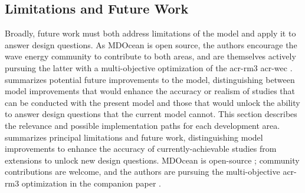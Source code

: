 \subsection{Limitations and Future Work}\label{sec:unmodeled-effects}
\ifdefined\DISSERTATION
    Broadly, future work must both address limitations of the model and apply it to answer design questions.
    As MDOcean is open source, the authors encourage the wave energy community to contribute to both areas, and are themselves actively pursuing the latter with a multi-objective optimization of the \gls{acr-rm3} \gls{acr-wec} \citep{mccabe_leveraging_2026}.
     summarizes potential future improvements to the model, distinguishing between model improvements that would enhance the accuracy or realism of studies that can be conducted with the present model and those that would unlock the ability to answer design questions that the current model cannot.
    This section describes the relevance and possible implementation paths for each development area.
\else
     summarizes principal limitations and future work, distinguishing model improvements to enhance the accuracy of currently-achievable studies from extensions to unlock new design questions.
    MDOcean is open-source \citep{mccabe_mdocean_2024}; community contributions are welcome, and the authors are pursuing the multi-objective \gls{acr-rm3} optimization in the companion paper \citep{mccabe_leveraging_2026}.
\fi

\newcommand{\modelTrustBuilders}{
    \begin{enumerate}[leftmargin=*]
        \item Surge force and mooring cost
        \item \gls{acr-nl} storm wave forces
        \item \gls{acr-irr}
        \item Structure: thinner plates, better validation
        \item Additional \gls{acr-pto} nonlinearities
    \end{enumerate}
}

\newcommand{\modelStudyEnablers}{
    \begin{enumerate}[leftmargin=*]
        \item Spectral power, load, amplitude
        \item Different \gls{acr-wec} archetypes
        \item Lifetime and sea state contours
        \item \gls{acr-meem} extensions for damping plate and 3+ cylinders
        \item Generator magnetics and cost
        \item Other structural materials
    \end{enumerate}
}

